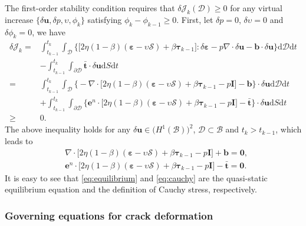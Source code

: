 \documentclass{article}
\begin{document}
The first-order stability condition requires that $\delta\mathcal J_k(\mathcal D)\geq 0$ for any virtual increase $\{\delta\bm u, \delta p, \upsilon, \phi_k\}$ satisfying $\phi_k - \phi_{k-1}\geq 0$. First, let $\delta p = 0$, $\delta\upsilon = 0$ and $\delta\phi_k = 0$, we have
\[
  \begin{aligned}
    \delta\mathcal J_k 
    =&\int_{t_{k-1}}^{t_k}\int_{\mathcal D}\Big\{\big[2\eta(1-\beta)(\bm\varepsilon - \upsilon\bm{\mathcal S}) + \beta\bm\tau_{k-1}\big] : \delta\bm\varepsilon - p\nabla\cdot\delta\bm u - \bm b\cdot\delta\bm u\Big\}\mathrm d\mathcal D\mathrm dt \\
    &-\int_{t_{k-1}}^{t_k}\int_{\partial\mathcal D}\bar{\bm t}\cdot\delta\bm u\mathrm dS\mathrm dt \\
    =&\int_{t_{k-1}}^{t_k}\int_{\mathcal D}\Big\{-\nabla\cdot\big[2\eta(1-\beta)(\bm\varepsilon - \upsilon\bm{\mathcal S}) + \beta\bm\tau_{k-1} - p\bm I\big] - \bm b\Big\}\cdot\delta\bm u\mathrm d\mathcal D\mathrm dt \\
    &+\int_{t_{k-1}}^{t_k}\int_{\partial\mathcal D}\Big\{\bm e^n\cdot\big[2\eta(1-\beta)(\bm\varepsilon - \upsilon\bm{\mathcal S}) + \beta\bm\tau_{k-1} - p\bm I\big] - \bar{\bm t}\Big\}\cdot\delta\bm u\mathrm dS\mathrm dt \\
    \geq&0.
  \end{aligned}
\]
The above inequality holds for any $\delta\bm u\in\big(H^1(\mathcal B)\big)^2$, $\mathcal D\subset\mathcal B$ and $t_k > t_{k-1}$, which leads to
\begin{subequations}
  \begin{align}
    &\nabla\cdot\big[2\eta(1-\beta)(\bm\varepsilon - \upsilon\bm{\mathcal S}) + \beta\bm\tau_{k-1} - p\bm I\big] + \bm b = \bm 0,\label{eq:equilibrium}\\
    &\bm e^n\cdot\big[2\eta(1-\beta)(\bm\varepsilon - \upsilon\bm{\mathcal S}) + \beta\bm\tau_{k-1} - p\bm I\big] - \bar{\bm t} = \bm 0.\label{eq:cauchy}
  \end{align}
\end{subequations}
It is easy to see that \eqref{eq:equilibrium} and \eqref{eq:cauchy} are the quasi-static equilibrium equation and the definition of Cauchy stress, respectively.


\subsubsection{Governing equations for crack deformation}\label{sect:crack deformation}
\end{document}

